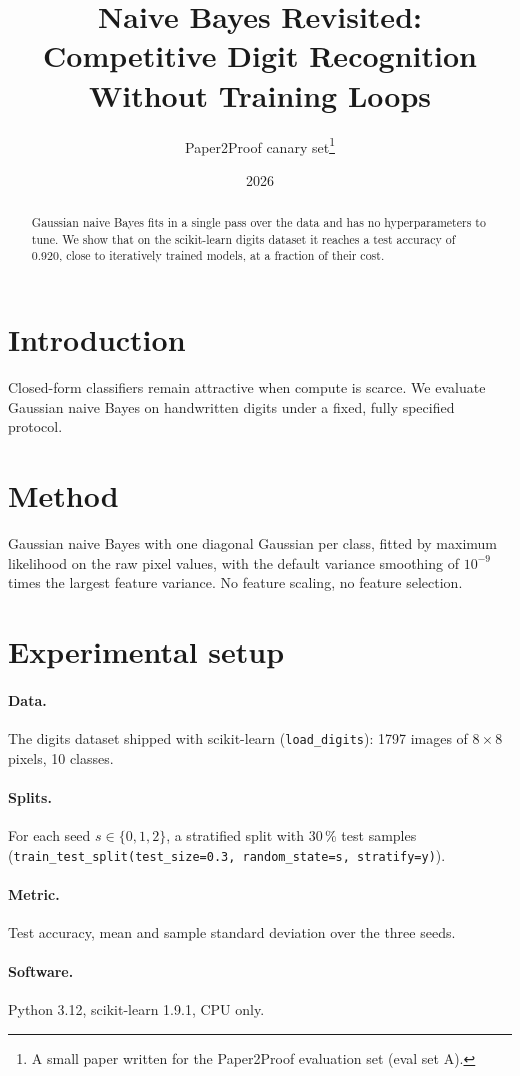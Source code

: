 \documentclass[11pt]{article}
\title{Naive Bayes Revisited: Competitive Digit Recognition Without Training Loops}
\author{Paper2Proof canary set\thanks{A small paper written for the Paper2Proof evaluation set (eval set A).}}
\date{2026}
\begin{document}
\maketitle

\begin{abstract}
Gaussian naive Bayes fits in a single pass over the data and has no hyperparameters to tune. We
show that on the scikit-learn digits dataset it reaches a test accuracy of 0.920, close to
iteratively trained models, at a fraction of their cost.
\end{abstract}

\section{Introduction}
Closed-form classifiers remain attractive when compute is scarce. We evaluate Gaussian naive
Bayes on handwritten digits under a fixed, fully specified protocol.

\section{Method}
Gaussian naive Bayes with one diagonal Gaussian per class, fitted by maximum likelihood on the
raw pixel values, with the default variance smoothing of $10^{-9}$ times the largest feature
variance. No feature scaling, no feature selection.

\section{Experimental setup}
\paragraph{Data.} The digits dataset shipped with scikit-learn (\texttt{load\_digits}): 1797
images of $8 \times 8$ pixels, 10 classes.
\paragraph{Splits.} For each seed $s \in \{0, 1, 2\}$, a stratified split with 30\,\% test
samples (\texttt{train\_test\_split(test\_size=0.3, random\_state=s, stratify=y)}).
\paragraph{Metric.} Test accuracy, mean and sample standard deviation over the three seeds.
\paragraph{Software.} Python 3.12, scikit-learn 1.9.1, CPU only.
\end{document}

